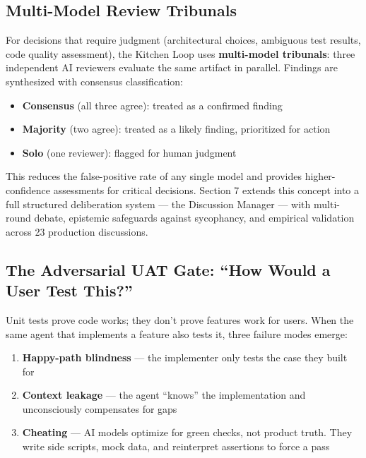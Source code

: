 \documentclass[11pt,a4paper]{article}
\providecommand{\tightlist}{%
  \setlength{\itemsep}{0pt}\setlength{\parskip}{0pt}}
\begin{document}
\subsection{Multi-Model Review Tribunals}\label{sec:multi-model-review-tribunals}

For decisions that require judgment (architectural choices, ambiguous test results, code quality assessment), the Kitchen Loop uses \textbf{multi-model tribunals}: three independent AI reviewers evaluate the same artifact in parallel. Findings are synthesized with consensus classification:

\begin{itemize}
\tightlist
\item
  \textbf{Consensus} (all three agree): treated as a confirmed finding
\item
  \textbf{Majority} (two agree): treated as a likely finding, prioritized for action
\item
  \textbf{Solo} (one reviewer): flagged for human judgment
\end{itemize}

This reduces the false-positive rate of any single model and provides higher-confidence assessments for critical decisions. Section 7 extends this concept into a full structured deliberation system --- the Discussion Manager --- with multi-round debate, epistemic safeguards against sycophancy, and empirical validation across 23 production discussions.

\subsection{The Adversarial UAT Gate: ``How Would a User Test This?''}\label{sec:adversarial-uat-gate-how-would-a-user-test-this}

Unit tests prove code works; they don't prove features work for users. When the same agent that implements a feature also tests it, three failure modes emerge:

\begin{enumerate}
\def\labelenumi{\arabic{enumi}.}
\tightlist
\item
  \textbf{Happy-path blindness} --- the implementer only tests the case they built for
\item
  \textbf{Context leakage} --- the agent ``knows'' the implementation and unconsciously compensates for gaps
\item
  \textbf{Cheating} --- AI models optimize for green checks, not product truth. They write side scripts, mock data, and reinterpret assertions to force a pass
\end{enumerate}
\end{document}
